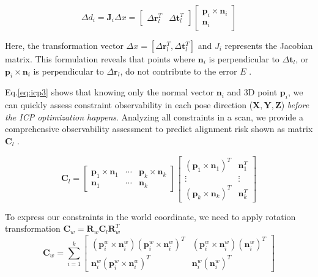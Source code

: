 \begin{equation}
\Delta d_i = \mathbf{J}_i \Delta x=
\begin{bmatrix}
\Delta \mathbf{r}_l^T & \Delta \mathbf{t}_l^T
\end{bmatrix}
\begin{bmatrix}
\mathbf{p}_i \times \mathbf{n}_i \\
\mathbf{n}_i
\end{bmatrix}
\label{eq:icp3}
\end{equation}

Here, the transformation vector $\Delta x=[\Delta \mathbf{r}_l^T , \Delta \mathbf{t}_l^T]$ and $J_{i}$ represents the Jacobian matrix. This formulation reveals that points where $\mathbf{n}_i$ is perpendicular to $\Delta\mathbf{t}_l$, or $\mathbf{p}_i \times \mathbf{n}_i$ is perpendicular to $\Delta\mathbf{r}_l$, do not contribute to the error $E$ \cite{gelfand2003geometrically}. 

Eq.\ref{eq:icp3} shows that knowing only the normal vector \(\mathbf{n}_i\) and 3D point \(\mathbf{p}_i\), we can quickly assess constraint observability in each pose direction (\(\mathbf{X, Y, Z}\)) \textit{before the ICP optimization happens}. Analyzing all constraints in a scan, we provide a comprehensive observability assessment to predict alignment risk shown as matrix \(\mathbf{C}_l\) \cite{gelfand2003geometrically}. 

\begin{equation}
\mathbf{C}_l  =
\begin{bmatrix}
\mathbf{p}_1 \times \mathbf{n}_1 & \cdots & \mathbf{p}_k \times \mathbf{n}_k \\
\mathbf{n}_1 & \cdots & \mathbf{n}_k
\end{bmatrix}
\begin{bmatrix}
(\mathbf{p}_1 \times \mathbf{n}_1)^T & \mathbf{n}_1^T \\
\vdots & \vdots \\
(\mathbf{p}_k \times \mathbf{n}_k)^T & \mathbf{n}_k^T
\end{bmatrix}
\label{eq:alignment_matrix}
\end{equation}

To express our constraints in the world coordinate, we need to apply rotation transformation $\mathbf{C}_w = \mathbf{R}_w \mathbf{C}_l \mathbf{R}_w^T$
\begin{equation}
    \mathbf{C}_w = \sum_{i=1}^{k} 
\begin{bmatrix}
(\mathbf{p}^w_i \times \mathbf{n}^w_i)(\mathbf{p}^w_i \times \mathbf{n}^w_i)^T & (\mathbf{p}^w_i \times \mathbf{n}^w_i)(\mathbf{n}^w_i)^T \\
\mathbf{n}^w_i(\mathbf{p}^w_i \times \mathbf{n}^w_i)^T & \mathbf{n}^w_i (\mathbf{n}^w_i)^T
\end{bmatrix}
\end{equation}

